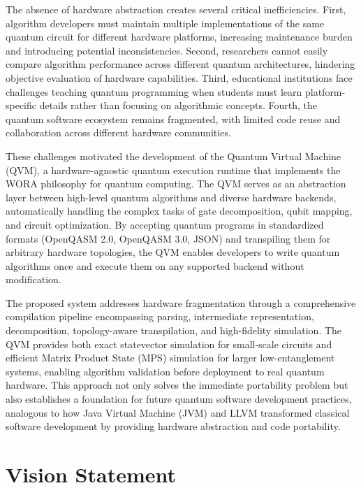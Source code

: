 The absence of hardware abstraction creates several critical inefficiencies. First, algorithm developers must maintain multiple implementations of the same quantum circuit for different hardware platforms, increasing maintenance burden and introducing potential inconsistencies. Second, researchers cannot easily compare algorithm performance across different quantum architectures, hindering objective evaluation of hardware capabilities. Third, educational institutions face challenges teaching quantum programming when students must learn platform-specific details rather than focusing on algorithmic concepts. Fourth, the quantum software ecosystem remains fragmented, with limited code reuse and collaboration across different hardware communities.

These challenges motivated the development of the Quantum Virtual Machine (QVM), a hardware-agnostic quantum execution runtime that implements the WORA philosophy for quantum computing. The QVM serves as an abstraction layer between high-level quantum algorithms and diverse hardware backends, automatically handling the complex tasks of gate decomposition, qubit mapping, and circuit optimization. By accepting quantum programs in standardized formats (OpenQASM 2.0, OpenQASM 3.0, JSON) and transpiling them for arbitrary hardware topologies, the QVM enables developers to write quantum algorithms once and execute them on any supported backend without modification.

The proposed system addresses hardware fragmentation through a comprehensive compilation pipeline encompassing parsing, intermediate representation, decomposition, topology-aware transpilation, and high-fidelity simulation. The QVM provides both exact statevector simulation for small-scale circuits and efficient Matrix Product State (MPS) simulation for larger low-entanglement systems, enabling algorithm validation before deployment to real quantum hardware. This approach not only solves the immediate portability problem but also establishes a foundation for future quantum software development practices, analogous to how Java Virtual Machine (JVM) and LLVM transformed classical software development by providing hardware abstraction and code portability.




\section{Vision Statement}

